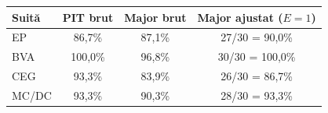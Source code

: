 \begin{center}
\begingroup\small
\begin{tabular}{@{}lccc@{}}
\toprule
Suită & PIT brut & Major brut & Major ajustat ($E=1$) \\
\midrule
EP & 86,7\% & 87,1\% & 27/30 = 90,0\% \\
BVA & 100,0\% & 96,8\% & 30/30 = 100,0\% \\
CEG & 93,3\% & 83,9\% & 26/30 = 86,7\% \\
MC/DC & 93,3\% & 90,3\% & 28/30 = 93,3\% \\
\bottomrule
\end{tabular}
\endgroup
\end{center}
